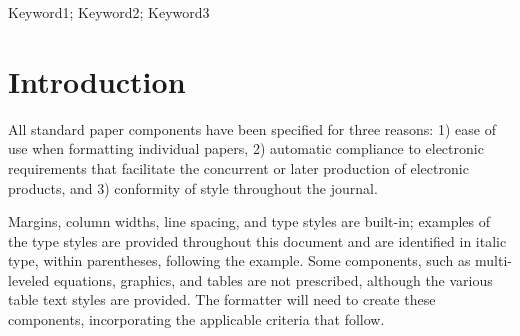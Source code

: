 \documentclass[conference, letterpaper]{IEEEtran}
\begin{document}
\begin{abstract}
This electronic document is a “live” template and already defines the components of your paper [title, text, heads, etc.] in its style sheet. The abstract should be concise and informative, comprising approximately 150–250 words. *CRITICAL:  Do Not Use Symbols, Special Characters, or Math in Paper Title or Abstract.
\end{abstract}



\begin{IEEEkeywords}
Keyword1; Keyword2; Keyword3
\end{IEEEkeywords}


%
\IEEEpeerreviewmaketitle



\section{Introduction}
All standard paper components have been specified for three reasons: 1) ease of use when formatting individual papers, 2) automatic compliance to electronic requirements that facilitate the concurrent or later production of electronic products, and 3) conformity of style throughout the journal.

Margins, column widths, line spacing, and type styles are built-in; examples of the type styles are provided throughout this document and are identified in italic type, within parentheses, following the example. Some components, such as multi-leveled equations, graphics, and tables are not prescribed, although the various table text styles are provided. The formatter will need to create these components, incorporating the applicable criteria that follow.
\end{document}
